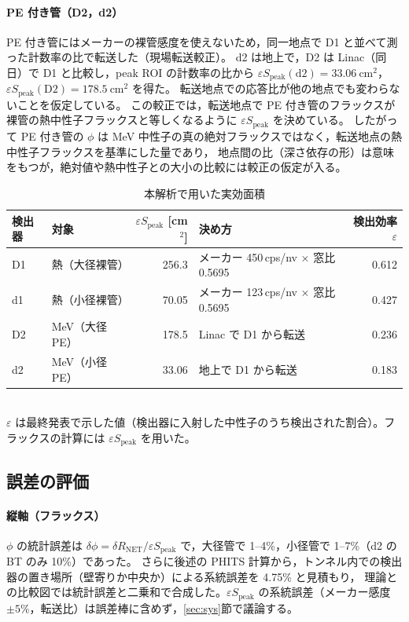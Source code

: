 \documentclass[a4paper,11pt]{ltjsarticle}
\newcommand{\RNET}{R_{\mathrm{NET}}}
\newcommand{\eSpk}{\varepsilon S_{\mathrm{peak}}}
\begin{document}
\paragraph{PE 付き管（D2，d2）}
PE 付き管にはメーカーの裸管感度を使えないため，同一地点で D1 と並べて測った計数率の比で転送した（現場転送較正）。
d2 は地上で，D2 は Linac（同日）で D1 と比較し，peak ROI の計数率の比から
$\eSpk(\mathrm{d2})=33.06\ \mathrm{cm^2}$，$\eSpk(\mathrm{D2})=178.5\ \mathrm{cm^2}$ を得た。
転送地点での応答比が他の地点でも変わらないことを仮定している。
この較正では，転送地点で PE 付き管のフラックスが裸管の熱中性子フラックスと等しくなるように $\eSpk$ を決めている。
したがって PE 付き管の $\phi$ は MeV 中性子の真の絶対フラックスではなく，転送地点の熱中性子フラックスを基準にした量であり，
地点間の比（深さ依存の形）は意味をもつが，絶対値や熱中性子との大小の比較には較正の仮定が入る。

\begin{table}[htbp]
  \centering
  \caption{本解析で用いた実効面積}
  \label{tab:eff}
  \begin{tabular}{llrlr}
    \toprule
    検出器 & 対象 & $\eSpk$ [cm$^2$] & 決め方 & 検出効率 $\varepsilon$ \\
    \midrule
    D1 & 熱（大径裸管） & 256.3 & メーカー 450\,cps/nv × 窓比 0.5695 & 0.612 \\
    d1 & 熱（小径裸管） & 70.05 & メーカー 123\,cps/nv × 窓比 0.5695 & 0.427 \\
    D2 & MeV（大径 PE） & 178.5 & Linac で D1 から転送 & 0.236 \\
    d2 & MeV（小径 PE） & 33.06 & 地上で D1 から転送 & 0.183 \\
    \bottomrule
  \end{tabular}\\[2pt]
  \footnotesize $\varepsilon$ は最終発表で示した値（検出器に入射した中性子のうち検出された割合）。フラックスの計算には $\eSpk$ を用いた。
\end{table}

\subsection{誤差の評価}

\paragraph{縦軸（フラックス）}
$\phi$ の統計誤差は $\delta\phi=\delta\RNET/\eSpk$ で，大径管で 1--4\%，小径管で 1--7\%（d2 の BT のみ 10\%）であった。
さらに後述の PHITS 計算から，トンネル内での検出器の置き場所（壁寄りか中央か）による系統誤差を 4.75\% と見積もり，
理論との比較図では統計誤差と二乗和で合成した。$\eSpk$ の系統誤差（メーカー感度 $\pm5\%$，転送比）は誤差棒に含めず，\ref{sec:sys}節で議論する。
\end{document}

